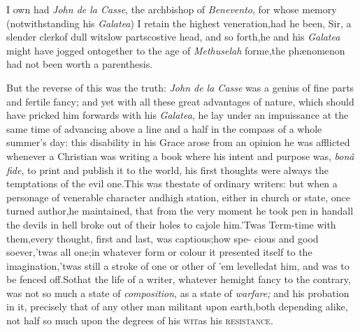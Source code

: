 \documentclass{article}
\begin{document}
I own had \textit{John de la Casse}, the archbishop of
\textit{Benevento}, for whose memory (notwithstanding his
\textit{Galatea}) I retain the highest veneration,\tsk had he
been, Sir, a slender clerk\tsk of dull wit\tsk slow
parts\tsk costive head, and so forth,\tsk he and his
\textit{Galatea} might have jogged on\break together to the age of
\textit{Methuselah} for\break me,\tsk the phænomenon had not been
worth a parenthesis.\tsk

But the reverse of this was the truth: \textit{John de la Casse}
was a genius of fine parts and fertile fancy; and yet with all
these great advantages of nature, which should have pricked him
forwards with his \textit{Ga\-latea}, he lay under an impuissance at
the same time of advancing above a line and a half in the compass
of a whole summer’s day: this disability in his Grace arose
from an opinion he was afflicted  whenever a Christian was writing a
book  where his intent and
purpose was, \textit{bonâ fide}, to print and publish it to the
world, his first thoughts were always the temptations of the evil
one.\tsk This was the\break state of ordinary writers: but when a
personage of venerable character and\break high station, either in church
or state, once turned author,\tsk he maintained, that from the
very moment he took pen in hand\tsk all the devils in hell broke
out of their holes to cajole him.\tsk ’Twas Term-time with
them,\tsk every thought, first and last, was captious;\tsk how spe-
cious and good soever,\tsk ’twas all one;\break\tsk in whatever form or
colour it present\-ed itself to the imagination,\tsk ’twas still\break 
a stroke of one or other of ’em levelled\break at him,
and was to be fenced off.\tsk So\break that the life of a writer,
whatever he\break might fancy to the contrary, was not so much a state of
\textit{composition}, as a state of \textit{warfare;} and his probation
in it, precisely that of any other man militant upon\break
earth,\tsk both depending alike, not half so much upon the
degrees of his \textsc{wit}\tsk\break as his \textsc{resistance}.
\end{document}
